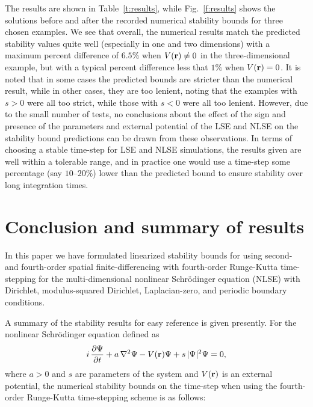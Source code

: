 \documentclass{article}
\begin{document}
The results are shown in Table~\ref{t:results}, while Fig.~\ref{f:results} shows the solutions before and after the recorded numerical stability bounds for three chosen examples.
We see that overall, the numerical results match the predicted stability 
values quite well (especially in one and two dimensions) with a maximum 
percent difference of $6.5\%$ when $V({\bf r})\not= 0$ in the three-dimensional
example, but with a typical percent difference less that $1\%$ when 
$V({\bf r})=0$.  
It is noted that in some cases the predicted bounds are stricter than the numerical result, while in other cases, they are too lenient, noting that the examples with $s>0$ were all too strict, while those with $s<0$ were all too lenient.  However, due to the small number of tests, no conclusions about the effect of the sign and presence of the parameters and external potential of the LSE and NLSE on the stability bound predictions can be drawn from these observations.  
In terms of choosing a stable time-step for LSE and NLSE simulations, the results given are well within a tolerable range, and in practice one would use a time-step some percentage (say $10$--$20\%$) lower than the predicted bound to ensure stability over long integration times.

\section{Conclusion and summary of results}
\label{s:sum}
In this paper we have formulated linearized stability bounds for using second- and fourth-order spatial finite-differencing with fourth-order Runge-Kutta time-stepping for the multi-dimensional nonlinear Schr{\"o}dinger equation (NLSE) with Dirichlet, modulus-squared Dirichlet, Laplacian-zero, and periodic boundary conditions.  

A summary of the stability results for easy reference is given presently.  For the nonlinear Schr{\"o}dinger equation defined as 
\[
i\, \frac{\partial \Psi}{\partial t} +a\,\nabla^2 \Psi -V({\bf r})\Psi + s\,|\Psi|^2\Psi = 0,
\]
where $a>0$ and $s$ are parameters of the system and $V({\bf r})$ is an external potential, the numerical stability bounds on the time-step when using the fourth-order Runge-Kutta time-stepping scheme is as follows: 
\end{document}
